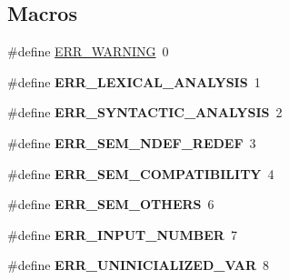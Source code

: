 \subsection*{Macros}
\begin{DoxyCompactItemize}
\item 
\#define \hyperlink{group__expression__processing_gad39ffaaf2f15904baf361c8a95eea23f}{E\+R\+R\+\_\+\+W\+A\+R\+N\+I\+N\+G}~0
\item 
\hypertarget{group__expression__processing_gae1b0d4386e23ff5b3e5a2f2d3bb2e595}{}\#define {\bfseries E\+R\+R\+\_\+\+L\+E\+X\+I\+C\+A\+L\+\_\+\+A\+N\+A\+L\+Y\+S\+I\+S}~1\label{group__expression__processing_gae1b0d4386e23ff5b3e5a2f2d3bb2e595}

\item 
\hypertarget{group__expression__processing_ga65bbcacac1fab0692da94892852f763f}{}\#define {\bfseries E\+R\+R\+\_\+\+S\+Y\+N\+T\+A\+C\+T\+I\+C\+\_\+\+A\+N\+A\+L\+Y\+S\+I\+S}~2\label{group__expression__processing_ga65bbcacac1fab0692da94892852f763f}

\item 
\hypertarget{group__expression__processing_ga48c742e0bcd4765bff4dff57adaf4ea3}{}\#define {\bfseries E\+R\+R\+\_\+\+S\+E\+M\+\_\+\+N\+D\+E\+F\+\_\+\+R\+E\+D\+E\+F}~3\label{group__expression__processing_ga48c742e0bcd4765bff4dff57adaf4ea3}

\item 
\hypertarget{group__expression__processing_ga8f52bafe7d43e6354bae75d2caa5a3e1}{}\#define {\bfseries E\+R\+R\+\_\+\+S\+E\+M\+\_\+\+C\+O\+M\+P\+A\+T\+I\+B\+I\+L\+I\+T\+Y}~4\label{group__expression__processing_ga8f52bafe7d43e6354bae75d2caa5a3e1}

\item 
\hypertarget{group__expression__processing_ga1618901d33a81fae88c01635dc5cef54}{}\#define {\bfseries E\+R\+R\+\_\+\+S\+E\+M\+\_\+\+O\+T\+H\+E\+R\+S}~6\label{group__expression__processing_ga1618901d33a81fae88c01635dc5cef54}

\item 
\hypertarget{group__expression__processing_ga43ec102bd6ec2f2858cd4e1a4dbf6742}{}\#define {\bfseries E\+R\+R\+\_\+\+I\+N\+P\+U\+T\+\_\+\+N\+U\+M\+B\+E\+R}~7\label{group__expression__processing_ga43ec102bd6ec2f2858cd4e1a4dbf6742}

\item 
\hypertarget{group__expression__processing_ga28cd80ee0db6b3d64692d4b0ec19a6c4}{}\#define {\bfseries E\+R\+R\+\_\+\+U\+N\+I\+N\+I\+C\+I\+A\+L\+I\+Z\+E\+D\+\_\+\+V\+A\+R}~8\label{group__expression__processing_ga28cd80ee0db6b3d64692d4b0ec19a6c4}


\end{DoxyCompactItemize}
